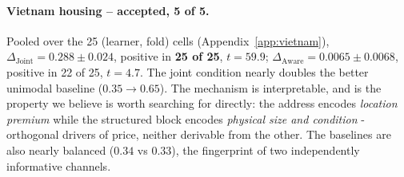 \documentclass{article}
\newcommand{\djoint}{\Delta_{\text{Joint}}}
\newcommand{\daware}{\Delta_{\text{Aware}}}
\begin{document}




\paragraph{Vietnam housing -- accepted, 5 of 5.} Pooled over the 25 (learner, fold) cells
(Appendix~\ref{app:vietnam}), $\djoint = 0.288 \pm 0.024$, positive in \textbf{25 of 25},
$t = 59.9$; $\daware = 0.0065 \pm 0.0068$, positive in 22 of 25, $t = 4.7$. The joint condition
nearly doubles the better unimodal baseline ($0.35 \rightarrow 0.65$). The mechanism is
interpretable, and is the property we believe is worth searching for directly: the address encodes
\emph{location premium} while the structured block encodes \emph{physical size and condition}
- orthogonal drivers of price, neither derivable from the other. The baselines are also
nearly balanced ($0.34$ vs $0.33$), the fingerprint of two independently informative channels.
\end{document}
